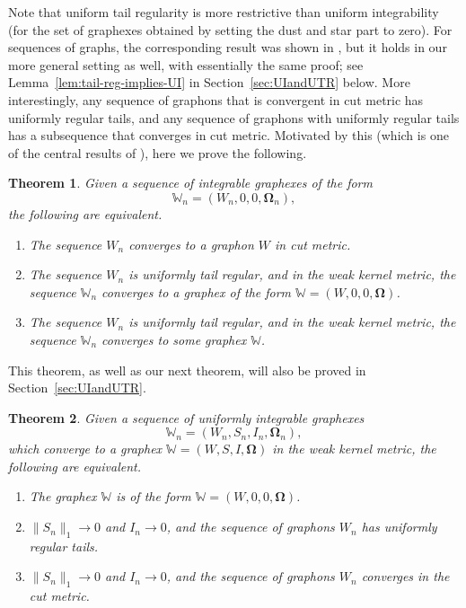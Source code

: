 \documentclass{amsart}
\numberwithin{equation}{section}
\numberwithin{figure}{section}
\newtheorem{theorem}{Theorem}[section]
\theoremstyle{definition}
\theoremstyle{remark}
\newcommand{\bOmega}{{\mathbf{\Omega}}}
\newcommand{\cW}{\mathbb{W}}
\begin{document}
Note that uniform tail regularity is more restrictive than uniform
integrability (for the set of graphexes obtained by setting the dust and star
part to zero). For sequences of graphs, the corresponding result was shown in
\cite{BCCV17}, but it holds in our more general setting as well, with
essentially the same proof; see Lemma~\ref{lem:tail-reg-implies-UI} in
Section~\ref{sec:UIandUTR} below. More interestingly, any sequence of
graphons that is convergent in cut metric has uniformly regular tails, and
any sequence of graphons with uniformly regular tails has a subsequence that
converges in cut metric. Motivated by this (which is one of the central
results of \cite{BCCH16}), here we prove the following.

\begin{theorem} \label{thmcutmetricvsweakkernel}
Given a sequence of integrable graphexes of the form
\[\cW_n=(W_n,0,0,\bOmega_n),
\]
the following are equivalent.
\begin{enumerate}
\item The sequence $W_n$ converges to a graphon $W$ in cut metric.
\item The sequence $W_n$ is uniformly tail regular, and in the weak kernel
    metric, the sequence $\cW_n$ converges to a graphex of the form
    $\cW=(W,0,0,\bOmega)$.
\item The sequence $W_n$ is uniformly tail regular, and in the weak kernel
    metric, the sequence $\cW_n$ converges to some graphex $\cW$.
\end{enumerate}
\end{theorem}

This theorem, as well as our next theorem, will also be proved in
Section~\ref{sec:UIandUTR}.

\begin{theorem} \label{thmwhenconvergetographon}
Given a sequence of uniformly integrable graphexes
\[
\cW_n=(W_n,S_n,I_n,\bOmega_n),
\]
which converge to a graphex $\cW=(W,S,I,\bOmega)$ in the weak kernel metric,
the following are equivalent.
\begin{enumerate}
\item The graphex $\cW$ is of the form $\cW=(W,0,0,\bOmega)$.
\item $\|S_n\|_1 \to 0$ and $I_n \to 0$, and the sequence of graphons $W_n$
    has uniformly regular tails.
\item $\|S_n\|_1 \to 0$ and $I_n \to 0$, and the sequence of graphons $W_n$
    converges in the cut metric.
\end{enumerate}
\end{theorem}
\end{document}
